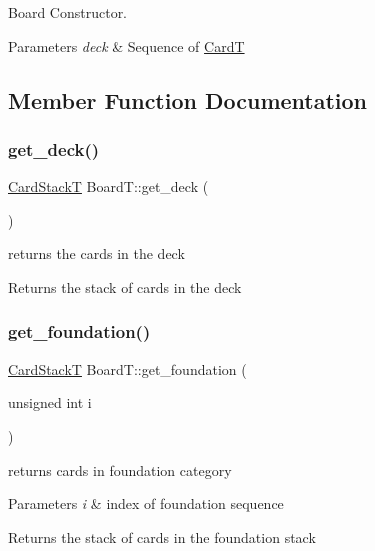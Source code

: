 Board Constructor. 


\begin{DoxyParams}{Parameters}
{\em deck} & Sequence of \hyperlink{struct_card_t}{CardT} \\
\hline
\end{DoxyParams}


\subsection{Member Function Documentation}
\mbox{\label{class_board_t_a2f28e0a5e9c34f396e2aebc79342a225}} 
\subsubsection{\texorpdfstring{get\+\_\+deck()}{get\_deck()}}
{\footnotesize\ttfamily \hyperlink{_card_stack_8h_a29a6854caf5fec306ee8fc0c6b453837}{Card\+StackT} Board\+T\+::get\+\_\+deck (\begin{DoxyParamCaption}{ }\end{DoxyParamCaption})}



returns the cards in the deck 

\begin{DoxyReturn}{Returns}
the stack of cards in the deck 
\end{DoxyReturn}
\mbox{\label{class_board_t_acc73c4130747c4848e757bc643927160}} 
\subsubsection{\texorpdfstring{get\+\_\+foundation()}{get\_foundation()}}
{\footnotesize\ttfamily \hyperlink{_card_stack_8h_a29a6854caf5fec306ee8fc0c6b453837}{Card\+StackT} Board\+T\+::get\+\_\+foundation (\begin{DoxyParamCaption}\item[{unsigned int}]{i }\end{DoxyParamCaption})}



returns cards in foundation category 


\begin{DoxyParams}{Parameters}
{\em i} & index of foundation sequence \\
\hline
\end{DoxyParams}
\begin{DoxyReturn}{Returns}
the stack of cards in the foundation stack 
\end{DoxyReturn}
\mbox{\label{class_board_t_a8435d5e5538d9d7fc4f335063183694a}} 
